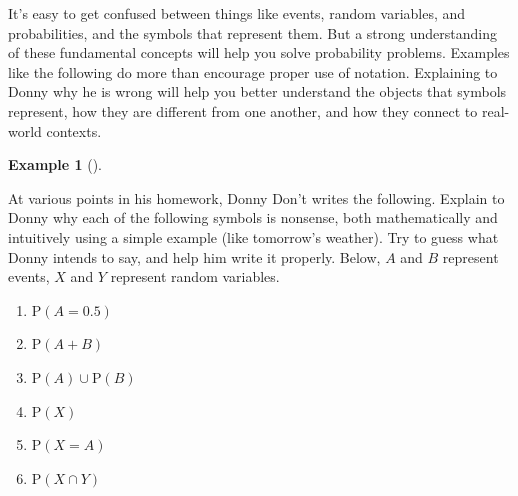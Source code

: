 \documentclass[
  letterpaper,
  DIV=11,
  numbers=noendperiod]{scrreprt}
\providecommand{\tightlist}{%
  \setlength{\itemsep}{0pt}\setlength{\parskip}{0pt}}
\theoremstyle{plain}
\theoremstyle{definition}
\newtheorem{example}{Example}[chapter]
\theoremstyle{definition}
\theoremstyle{definition}
\theoremstyle{remark}
\begin{document}
It's easy to get confused between things like events, random variables,
and probabilities, and the symbols that represent them. But a strong
understanding of these fundamental concepts will help you solve
probability problems. Examples like the following do more than encourage
proper use of notation. Explaining to Donny why he is wrong will help
you better understand the objects that symbols represent, how they are
different from one another, and how they connect to real-world contexts.

\begin{tcolorbox}[enhanced jigsaw, opacityback=0, left=2mm, colframe=quarto-callout-note-color-frame, toprule=.15mm, breakable, colback=white, leftrule=.75mm, arc=.35mm, rightrule=.15mm, bottomrule=.15mm]

\begin{example}[]\protect\hypertarget{exm-dd-notation}{}\label{exm-dd-notation}

At various points in his homework, Donny Don't writes the following.
Explain to Donny why each of the following symbols is nonsense, both
mathematically and intuitively using a simple example (like tomorrow's
weather). Try to guess what Donny intends to say, and help him write it
properly. Below, \(A\) and \(B\) represent events, \(X\) and \(Y\)
represent random variables.

\begin{enumerate}
\def\labelenumi{\arabic{enumi}.}
\tightlist
\item
  \(\textrm{P}(A = 0.5)\)
\item
  \(\textrm{P}(A + B)\)
\item
  \(\textrm{P}(A) \cup \textrm{P}(B)\)
\item
  \(\textrm{P}(X)\)
\item
  \(\textrm{P}(X = A)\)
\item
  \(\textrm{P}(X \cap Y)\)
\end{enumerate}

\end{example}

\end{tcolorbox}
\end{document}
